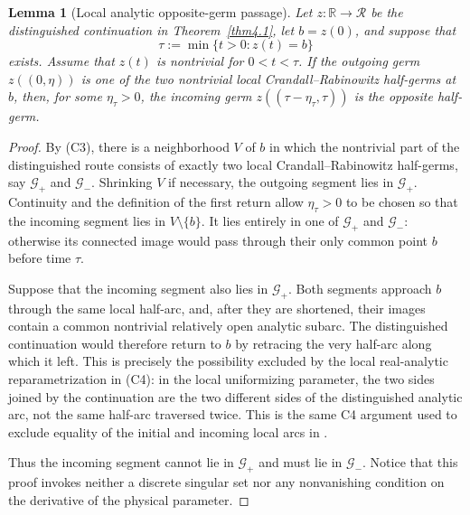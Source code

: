 \documentclass[11pt,reqno]{amsart}
\numberwithin{equation}{section}
\newtheorem{lemma}[theorem]{Lemma}
\theoremstyle{definition}
\theoremstyle{remark}
\begin{document}
\begin{lemma}[Local analytic opposite-germ passage]
\label{lem:no-retracing-return}
Let $z:\mathbb R\to\mathscr R$ be the distinguished continuation in
Theorem~\ref{thm4.1}, let $b=z(0)$, and suppose that
\[
 \tau:=\min\{t>0:z(t)=b\}
\]
exists.  Assume that $z(t)$ is nontrivial for $0<t<\tau$.  If the
outgoing germ $z((0,\eta))$ is one of the two nontrivial local
Crandall--Rabinowitz half-germs at $b$, then, for some $\eta_\tau>0$,
the incoming germ $z((\tau-\eta_\tau,\tau))$ is the opposite
half-germ.
\end{lemma}
\begin{proof}
By (C3), there is a neighborhood $V$ of $b$ in which the nontrivial
part of the distinguished route consists of exactly two local
Crandall--Rabinowitz half-germs, say $\mathscr G_+$ and
$\mathscr G_-$.  Shrinking $V$ if necessary, the outgoing segment
lies in $\mathscr G_+$.  Continuity and the definition of the first
return allow $\eta_\tau>0$ to be chosen so that the incoming segment
lies in $V\setminus\{b\}$.  It lies entirely in one of
$\mathscr G_+$ and $\mathscr G_-$: otherwise its connected image
would pass through their only common point $b$ before time $\tau$.

Suppose that the incoming segment also lies in $\mathscr G_+$.  Both
segments approach $b$ through the same local half-arc, and, after
they are shortened, their images contain a common nontrivial
relatively open analytic subarc.  The distinguished continuation
would therefore return to $b$ by retracing the very half-arc along
which it left.  This is precisely the possibility excluded by the
local real-analytic reparametrization in (C4): in the local
uniformizing parameter, the two sides joined by the continuation are
the two different sides of the distinguished analytic arc, not the
same half-arc traversed twice.  This is the same C4 argument used to
exclude equality of the initial and incoming local arcs in
\cite[Section 4]{ConstantinSV}.

Thus the incoming segment cannot lie in $\mathscr G_+$ and must lie
in $\mathscr G_-$.  Notice that this proof invokes neither a discrete
singular set nor any nonvanishing condition on the derivative of the
physical parameter.
\end{proof}
\end{document}
